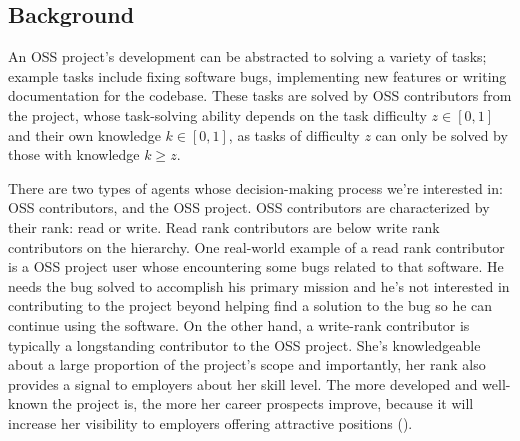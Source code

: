 \documentclass[source/paper/main.tex]{subfiles}
\begin{document}
\subsection{Background}
An OSS project's development can be abstracted to solving a variety of tasks; example tasks include fixing software bugs, implementing new features or writing documentation for the codebase. These tasks are solved by OSS contributors from the project, whose task-solving ability depends on the task difficulty $z \in [0, 1]$ and their own knowledge $k \in [0, 1]$, as tasks of difficulty $z$ can only be solved by those with knowledge $k \geq z$. 

\qquad There are two types of agents whose decision-making process we're interested in: OSS contributors, and the OSS project. OSS contributors are characterized by their rank: read or write. Read rank contributors are below write rank contributors on the hierarchy. One real-world example of a read rank contributor is a OSS project user whose encountering some bugs related to that software. He needs the bug solved to accomplish his primary mission and he's not interested in contributing to the project beyond helping find a solution to the bug so he can continue using the software.  On the other hand, a write-rank contributor is typically a longstanding contributor to the OSS project. She's knowledgeable about a large proportion of the project's scope and importantly, her rank also provides a signal to employers about her skill level. The more developed and well-known the project is, the more her career prospects improve, because it will increase her visibility to employers offering attractive positions (\cite{hann_economic_2002}). 
\end{document}
